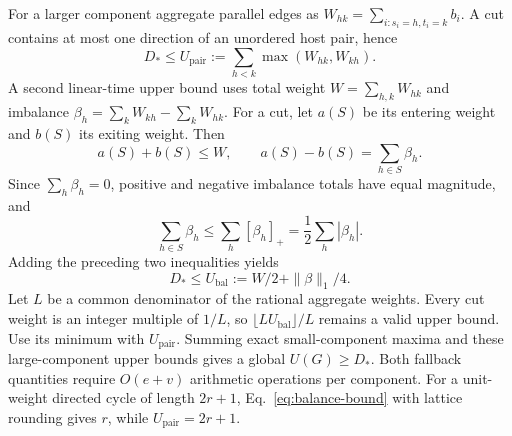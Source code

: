 \documentclass[11pt]{article}
\begin{document}
For a larger component aggregate parallel edges as $W_{hk}=\sum_{i:s_i=h,t_i=k}b_i$. A cut contains at most one direction of an unordered host pair, hence
\begin{equation}
 D_*\le U_{\mathrm{pair}}:=\sum_{h<k}\max(W_{hk},W_{kh}).
\end{equation}
A second linear-time upper bound uses total weight $W=\sum_{h,k}W_{hk}$ and imbalance $\beta_h=\sum_kW_{kh}-\sum_kW_{hk}$. For a cut, let $a(S)$ be its entering weight and $b(S)$ its exiting weight. Then
\begin{equation}
 a(S)+b(S)\le W,\qquad a(S)-b(S)=\sum_{h\in S}\beta_h.
\end{equation}
Since $\sum_h\beta_h=0$, positive and negative imbalance totals have equal magnitude, and
\begin{equation}
 \sum_{h\in S}\beta_h\le\sum_h[\beta_h]_+=\frac12\sum_h|\beta_h|.
\end{equation}
Adding the preceding two inequalities yields
\begin{equation}
 D_*\le U_{\mathrm{bal}}:=W/2+\|\beta\|_1/4.
 \label{eq:balance-bound}
\end{equation}
Let $L$ be a common denominator of the rational aggregate weights. Every cut weight is an integer multiple of $1/L$, so $\lfloor L U_{\mathrm{bal}}\rfloor/L$ remains a valid upper bound. Use its minimum with $U_{\mathrm{pair}}$. Summing exact small-component maxima and these large-component upper bounds gives a global $U(G)\ge D_*$. Both fallback quantities require $O(e+v)$ arithmetic operations per component. For a unit-weight directed cycle of length $2r+1$, Eq.~\eqref{eq:balance-bound} with lattice rounding gives $r$, while $U_{\mathrm{pair}}=2r+1$.
\end{document}
